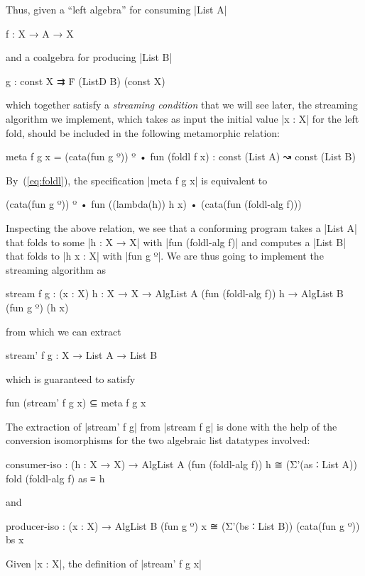 Thus, given a ``left algebra'' for consuming |List A|
\begin{code}
f : X → A → X
\end{code}
and a coalgebra for producing |List B|
\begin{code}
g : const X ⇉ Ḟ (ListD B) (const X)
\end{code}
which together satisfy a \emph{streaming condition} that we will see later, the streaming algorithm we implement, which takes as input the initial value |x : X| for the left fold, should be included in the following metamorphic relation:
\begin{code}
meta f g x = (cata(fun g º)) º • fun (foldl f x) : const (List A) ↝ const (List B)
\end{code}

By~(\ref{eq:foldl}), the specification |meta f g x| is equivalent to
\begin{code}
(cata(fun g º)) º • fun ((lambda(h)) h x) • (cata(fun (foldl-alg f)))
\end{code}
Inspecting the above relation, we see that a conforming program takes a |List A| that folds to some |h : X → X| with |fun (foldl-alg f)| and computes a |List B| that folds to |h x : X| with |fun g º|.
We are thus going to implement the streaming algorithm as
\begin{code}
stream f g :  (x : X) {h : X → X} →
              AlgList A (fun (foldl-alg f)) h → AlgList B (fun g º) (h x)
\end{code}
from which we can extract
\begin{code}
stream' f g : X → List A → List B
\end{code}
which is guaranteed to satisfy
\begin{code}
fun (stream' f g x)  ⊆ meta f g x
\end{code}
The extraction of |stream' f g| from |stream f g| is done with the help of the conversion isomorphisms for the two algebraic list datatypes involved:
\begin{code}
consumer-iso : (h : X → X) →  AlgList A (fun (foldl-alg f)) h
                                ≅ (Σ'(as ∶ List A)) fold (foldl-alg f) as ≡ h
\end{code}
and
\begin{code}
producer-iso : (x : X) → AlgList B (fun g º) x ≅ (Σ'(bs ∶ List B)) (cata(fun g º)) bs x
\end{code}
Given |x : X|, the definition of |stream' f g x|
